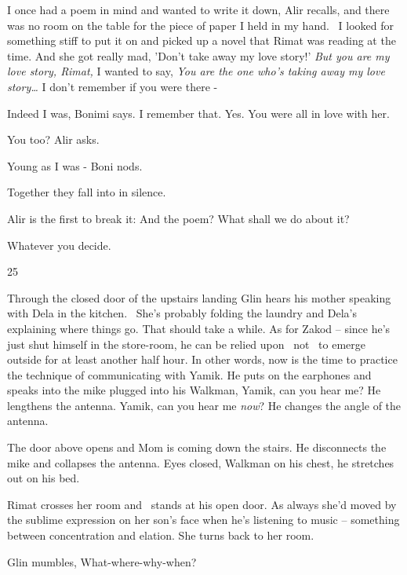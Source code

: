 \documentclass[letterpaper]{article}
\begin{document}
{\textquotedbl}I once had a poem in mind and wanted to write it down,{\textquotedbl} Alir recalls, {\textquotedbl}and
there was no room on the table for the piece of paper I held in my hand. ~I looked for something stiff to put it on and
picked up a novel that Rimat was reading at the time. And she got really mad, 'Don't take away my love story!'
\textit{But you are my love story, Rimat, }I wanted to say, \textit{You are the one who's taking away my love
story{\dots}} I don't remember if you were there -{\textquotedbl} 

{\textquotedbl}Indeed I was,{\textquotedbl} Bonimi says. {\textquotedbl}I remember that. Yes. You were all in love with
her.{\textquotedbl} 

{\textquotedbl}You too?{\textquotedbl} Alir asks. 

{\textquotedbl}Young as I was -{\textquotedbl} Boni nods. 

Together they fall into in silence.

Alir is the first to break it: {\textquotedbl}And the poem? What shall we do about it?{\textquotedbl} 

{\textquotedbl}Whatever you decide.{\textquotedbl}


\bigskip

25~~

Through the closed door of the upstairs landing Glin hears his mother speaking with Dela in the kitchen. \ She's
probably folding the laundry and Dela's explaining where things go. That should take a while. As for Zakod -- since
he's just shut himself in the store-room, he can be relied upon \ not \ to emerge outside for at least another half
hour. In other words, now is the time to practice the technique of communicating with Yamik. He puts on the earphones
and speaks into the mike plugged into his Walkman, {\textquotedbl}Yamik, can you hear me?{\textquotedbl} He lengthens
the antenna. {\textquotedbl}Yamik, can you hear me \textit{now}?{\textquotedbl} He changes the angle of the antenna.

The door above opens and Mom is coming down the stairs. He disconnects the mike and collapses{ }the
antenna. Eyes closed, Walkman on his chest, he stretches out on his bed.

Rimat crosses her room and \ stands at his open door. As always she'd moved by the sublime expression on her son's face
when he's listening to music -- something between concentration and elation. She turns back to her room.

Glin mumbles, {\textquotedbl}What-where-why-when?{\textquotedbl} 
\end{document}
